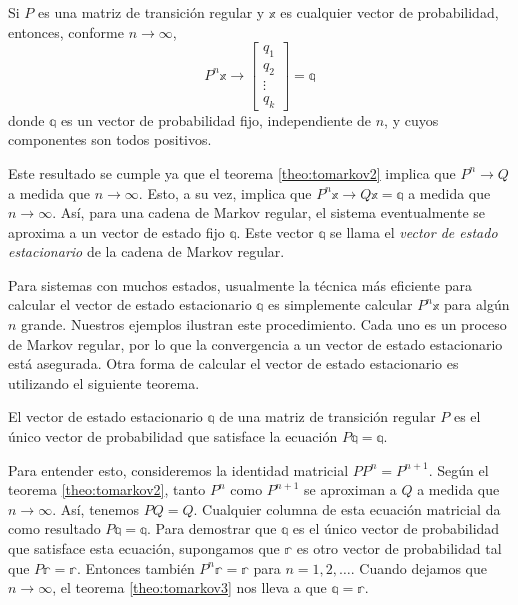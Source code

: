 \begin{theorem}\label{theo:tomarkov3}
    Si $P$ es una matriz de transición regular y $\mathbb{x}$ es cualquier vector de probabilidad, entonces, conforme $n \to \infty$, 
    $$P^n \mathbb{x} \to \begin{bmatrix}
        q_1 \\
        q_2 \\
        \vdots \\
        q_k
    \end{bmatrix} = \mathbb{q}$$
    donde $\mathbb{q}$ es un vector de probabilidad fijo, independiente de $n$, y cuyos componentes son todos positivos.
\end{theorem}

Este resultado se cumple ya que el teorema \ref{theo:tomarkov2} implica que $P^n \to Q$ a medida que $n \to \infty$. Esto, a su vez, implica que $P^n\mathbb{x} \to Q\mathbb{x} = \mathbb{q}$ a medida que $n \to \infty$. Así, para una cadena de Markov regular, el sistema eventualmente se aproxima a un vector de estado fijo $\mathbb{q}$. Este vector $\mathbb{q}$ se llama el \emph{vector de estado estacionario} de la cadena de Markov regular.

Para sistemas con muchos estados, usualmente la técnica más eficiente para calcular el vector de estado estacionario $\mathbb{q}$ es simplemente calcular $P^n \mathbb{x}$ para algún $n$ grande. Nuestros ejemplos ilustran este procedimiento. Cada uno es un proceso de Markov regular, por lo que la convergencia a un vector de estado estacionario está asegurada. Otra forma de calcular el vector de estado estacionario es utilizando el siguiente teorema.

\begin{theorem}\label{theo:tomarkov4}
    El vector de estado estacionario $\mathbb{q}$ de una matriz de transición regular $P$ es el único vector de probabilidad que satisface la ecuación $P \mathbb{q} = \mathbb{q}$.
\end{theorem}

Para entender esto, consideremos la identidad matricial $PP^n = P^{n+1}$. Según el teorema \ref{theo:tomarkov2}, tanto $P^n$ como $P^{n+1}$ se aproximan a $Q$ a medida que $n \to \infty$. Así, tenemos $PQ = Q$. Cualquier columna de esta ecuación matricial da como resultado $P\mathbb{q} = \mathbb{q}$. Para demostrar que $\mathbb{q}$ es el único vector de probabilidad que satisface esta ecuación, supongamos que $\mathbb{r}$ es otro vector de probabilidad tal que $P\mathbb{r} = \mathbb{r}$. Entonces también $P^n\mathbb{r} = \mathbb{r}$ para $n = 1, 2, \dots$. Cuando dejamos que $n \to \infty$, el teorema \ref{theo:tomarkov3} nos lleva a que $\mathbb{q} = \mathbb{r}$.

